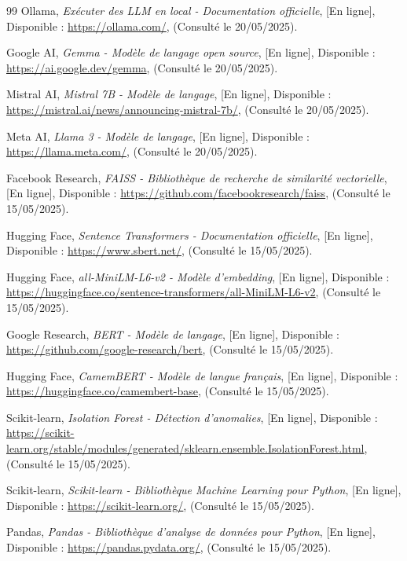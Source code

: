 \documentclass[12pt,a4paper]{report}
\begin{document}
\begin{thebibliography}{99}
 Ollama, \textit{Exécuter des LLM en local - Documentation officielle}, [En ligne], Disponible : \url{https://ollama.com/}, (Consulté le 20/05/2025).

 Google AI, \textit{Gemma - Modèle de langage open source}, [En ligne], Disponible : \url{https://ai.google.dev/gemma}, (Consulté le 20/05/2025).

 Mistral AI, \textit{Mistral 7B - Modèle de langage}, [En ligne], Disponible : \url{https://mistral.ai/news/announcing-mistral-7b/}, (Consulté le 20/05/2025).

 Meta AI, \textit{Llama 3 - Modèle de langage}, [En ligne], Disponible : \url{https://llama.meta.com/}, (Consulté le 20/05/2025).

 Facebook Research, \textit{FAISS - Bibliothèque de recherche de similarité vectorielle}, [En ligne], Disponible : \url{https://github.com/facebookresearch/faiss}, (Consulté le 15/05/2025).

 Hugging Face, \textit{Sentence Transformers - Documentation officielle}, [En ligne], Disponible : \url{https://www.sbert.net/}, (Consulté le 15/05/2025).

 Hugging Face, \textit{all-MiniLM-L6-v2 - Modèle d'embedding}, [En ligne], Disponible : \url{https://huggingface.co/sentence-transformers/all-MiniLM-L6-v2}, (Consulté le 15/05/2025).

 Google Research, \textit{BERT - Modèle de langage}, [En ligne], Disponible : \url{https://github.com/google-research/bert}, (Consulté le 15/05/2025).

 Hugging Face, \textit{CamemBERT - Modèle de langue français}, [En ligne], Disponible : \url{https://huggingface.co/camembert-base}, (Consulté le 15/05/2025).

 Scikit-learn, \textit{Isolation Forest - Détection d'anomalies}, [En ligne], Disponible : \url{https://scikit-learn.org/stable/modules/generated/sklearn.ensemble.IsolationForest.html}, (Consulté le 15/05/2025).

 Scikit-learn, \textit{Scikit-learn - Bibliothèque Machine Learning pour Python}, [En ligne], Disponible : \url{https://scikit-learn.org/}, (Consulté le 15/05/2025).

 Pandas, \textit{Pandas - Bibliothèque d'analyse de données pour Python}, [En ligne], Disponible : \url{https://pandas.pydata.org/}, (Consulté le 15/05/2025).



\end{thebibliography}
\end{document}
